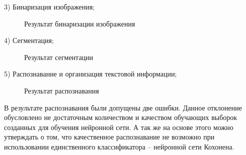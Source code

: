 \documentclass[14pt,a4paper]{extreport}
\begin{document}
\hspace {4ex} 3)	Бинаризация изображения;

 \begin{figure}[h!]
\caption{Результат бинаризации изображения}
\end{figure}

\hspace {4ex} 4)	Сегментация;

 \begin{figure}[h!]
\caption{Результат сегментации}
\end{figure}



\hspace {4ex} 5)	Распознавание и организация текстовой информации;

 \begin{figure}[h!]
\caption{Результат распознавания}
\end{figure}  

\hspace {4ex}В результате распознавания были допущены две ошибки. Данное отклонение обусловлено не достаточным количеством и качеством обучающих выборок созданных для обучения нейронной сети. А так же на основе этого можно утверждать о том, что качественное распознавание не возможно при использовании единственного классификатора – нейронной сети Кохонена.\
         
\end{document}

